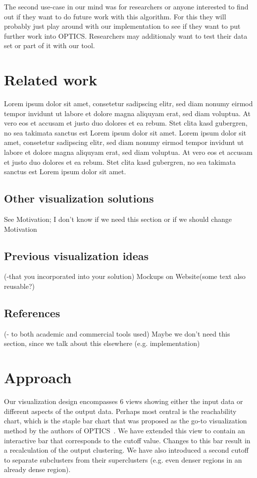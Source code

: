 \documentclass{vgtc}                          %
\begin{document}
\begin{flushleft}
The second use-case in our mind was for researchers or anyone interested to find out if they want to do future work with this algorithm. For this they will probably just play around with our implementation to see if they want to put further work into OPTICS. Researchers may additionaly want to test their data set or part of it with our tool.
\end{flushleft}


\section{Related work}

Lorem ipsum dolor sit amet, consetetur sadipscing elitr, sed diam
nonumy eirmod tempor invidunt ut labore et dolore magna aliquyam erat,
sed diam voluptua. At vero eos et accusam et justo duo dolores et ea
rebum. Stet clita kasd gubergren, no sea takimata sanctus est Lorem
ipsum dolor sit amet. Lorem ipsum dolor sit amet, consetetur
sadipscing elitr, sed diam nonumy eirmod tempor invidunt ut labore et
dolore magna aliquyam erat, sed diam voluptua. At vero eos et accusam
et justo duo dolores et ea rebum. Stet clita kasd gubergren, no sea
takimata sanctus est Lorem ipsum dolor sit amet.

\subsection{Other visualization solutions}
See Motivation; I don't know if we need this section or if we should change Motivation
\subsection{Previous visualization ideas}
(-that you incorporated into your solution)
Mockups on Website(some text also reusable?)
\subsection{References}
(- to both academic and commercial tools used)
Maybe we don't need this section, since we talk about this elsewhere (e.g. implementation)


\section{Approach} %

Our visualization design encompasses 6 views showing either the input data or
different aspects of the output data. Perhaps most central is the reachability
chart, which is the staple bar chart that was proposed as the go-to
visualization method by the authors of OPTICS~\cite{optics}. We have extended
this view to contain an interactive bar that corresponds to the cutoff value.
Changes to this bar result in a recalculation of the output clustering. We have
also introduced a second cutoff to separate subclusters from their
superclusters (e.g. even denser regions in an already dense region).
\end{document}
